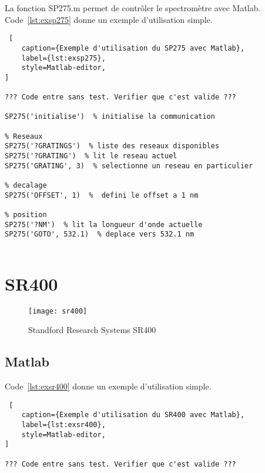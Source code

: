 \documentclass[11pt,francais]{book} %
\begin{document}
La fonction SP275.m permet de contrôler le spectromètre avec Matlab.
Code~\ref{lst:exsp275} donne un exemple d'utilisation simple.

\begin{lstlisting} [
    caption={Exemple d'utilisation du SP275 avec Matlab},
    label={lst:exsp275},
    style=Matlab-editor,
]

??? Code entre sans test. Verifier que c'est valide ???
  
SP275('initialise')  % initialise la communication

% Reseaux
SP275('?GRATINGS')  % liste des reseaux disponibles
SP275('?GRATING')  % lit le reseau actuel
SP275('GRATING', 3)  % selectionne un reseau en particulier

% decalage
SP275('OFFSET', 1)  %  defini le offset a 1 nm

% position
SP275('?NM')  % lit la longueur d'onde actuelle
SP275('GOTO', 532.1)  % deplace vers 532.1 nm
  
\end{lstlisting}



\section{SR400}

\begin{figure}[htbp]
\centering\texttt{[image: sr400]}
\caption{Standford Research Systems SR400}
\label{fig:sr400}
\end{figure}

\subsection{Matlab}

Code~\ref{lst:exsr400} donne un exemple d'utilisation simple.

\begin{lstlisting} [
    caption={Exemple d'utilisation du SR400 avec Matlab},
    label={lst:exsr400},
    style=Matlab-editor,
]

??? Code entre sans test. Verifier que c'est valide ???
  
\end{lstlisting}
\end{document}
